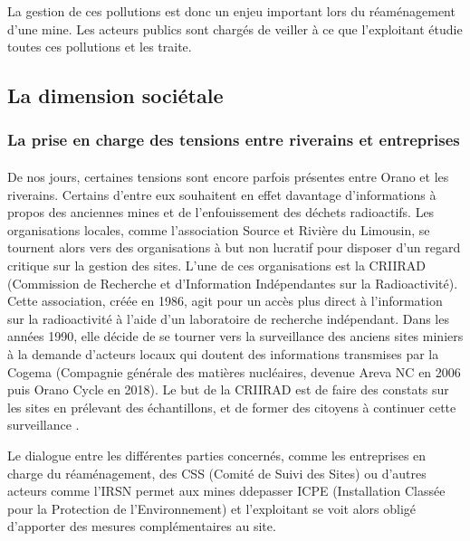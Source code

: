 \documentclass{article}
\begin{document}
La gestion de ces pollutions est donc un enjeu important lors du réaménagement d'une mine. Les acteurs publics sont chargés de veiller à ce que l'exploitant étudie toutes ces pollutions et les traite.


\subsection{La dimension sociétale}
\subsubsection{La prise en charge des tensions entre riverains et entreprises}
\paragraph{} De nos jours, certaines tensions sont encore parfois présentes entre Orano et les riverains. Certains d'entre eux souhaitent en effet davantage d’informations à propos des anciennes mines et de l'enfouissement des déchets radioactifs. Les organisations locales, comme l’association Source et Rivière du Limousin, se tournent alors vers des organisations à but non lucratif pour disposer d'un regard critique sur la gestion des sites. 
L’une de ces organisations est la CRIIRAD (Commission de Recherche et d'Information Indépendantes sur la Radioactivité). Cette association, créée en 1986, agit pour un accès plus direct à l’information sur la radioactivité à l’aide d’un laboratoire de recherche indépendant. Dans les années 1990, elle décide de se tourner vers la surveillance des anciens sites miniers à la demande d’acteurs locaux qui doutent des informations transmises par la Cogema (Compagnie générale des matières nucléaires, devenue Areva NC en 2006 puis Orano Cycle en 2018). Le but de la CRIIRAD est de faire des constats sur les sites en prélevant des échantillons, et de former des citoyens à continuer cette surveillance \cite{ina.fr_dossier_nodate} \cite{chareyron_limpact_2005}. 

Le dialogue entre les différentes parties concernés, comme les entreprises en charge du réaménagement, des CSS (Comité de Suivi des Sites) ou d’autres acteurs comme l’IRSN permet aux mines ddepasser ICPE (Installation Classée pour la Protection de l'Environnement) et l’exploitant se voit alors obligé d’apporter des mesures complémentaires au site.
\end{document}
